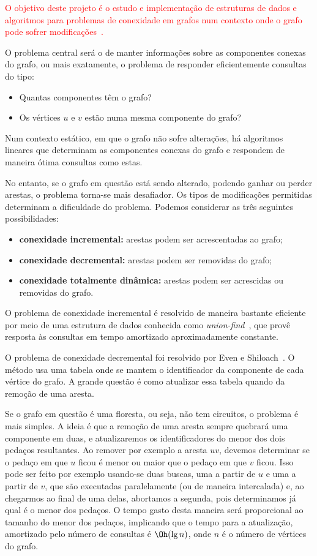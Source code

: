 \textcolor{red}{O objetivo deste projeto é o estudo e implementação de estruturas de dados e algoritmos 
para problemas de conexidade em grafos num contexto onde o grafo pode sofrer 
modificações~\cite{DemetrescuFI2004}.}  

O problema central será o de manter informações sobre as componentes conexas do grafo, 
ou mais exatamente, o problema de responder eficientemente consultas do tipo: 
\begin{itemize}
\item Quantas componentes têm o grafo?
\item Os vértices $u$ e $v$ estão numa mesma componente do grafo?
\end{itemize}

Num contexto estático, em que o grafo não sofre alterações, há algoritmos lineares que 
determinam as componentes conexas do grafo e respondem de maneira ótima consultas como estas.

No entanto, se o grafo em questão está sendo alterado, podendo ganhar ou perder arestas, 
o problema torna-se mais desafiador.  Os tipos de modificações permitidas determinam 
a dificuldade do problema.  Podemos considerar as três seguintes possibilidades: 
\begin{itemize}
\item {\bf conexidade incremental:} arestas podem ser acrescentadas ao grafo; 
\item {\bf conexidade decremental:} arestas podem ser removidas do grafo;
\item {\bf conexidade totalmente dinâmica:} arestas podem ser acrescidas ou removidas do grafo.
\end{itemize}

O problema de conexidade incremental é resolvido de maneira bastante eficiente por meio de 
uma estrutura de dados conhecida como \emph{union-find}~\cite{Tarjan1975}, que provê resposta 
às consultas em tempo amortizado aproximadamente constante. 

O problema de conexidade decremental foi resolvido por Even e Shiloach~\cite{EvenS1981}.  
O método usa uma tabela onde se mantem o identificador da componente de cada vértice do grafo.  
A grande questão é como atualizar essa tabela quando da remoção de uma aresta. 

Se o grafo em questão é uma floresta, ou seja, não tem circuitos, o problema é mais simples.  
A ideia é que a remoção de uma aresta sempre quebrará uma componente em duas, e atualizaremos
os identificadores do menor dos dois pedaços resultantes.  Ao remover por exemplo a aresta $uv$, 
devemos determinar se o pedaço em que $u$ ficou é menor ou maior que o pedaço em que $v$ ficou.  
Isso pode ser feito por exemplo usando-se duas buscas, uma a partir de $u$ e uma a partir de $v$, 
que são executadas paralelamente (ou de maneira intercalada) e, ao chegarmos ao final de uma delas, 
abortamos a segunda, pois determinamos já qual é o menor dos pedaços.  O tempo gasto desta maneira 
será proporcional ao tamanho do menor dos pedaços, implicando que o tempo para a atualização, 
amortizado pelo número de consultas é $\Oh(\lg n)$, onde $n$ é o número de vértices do grafo.

